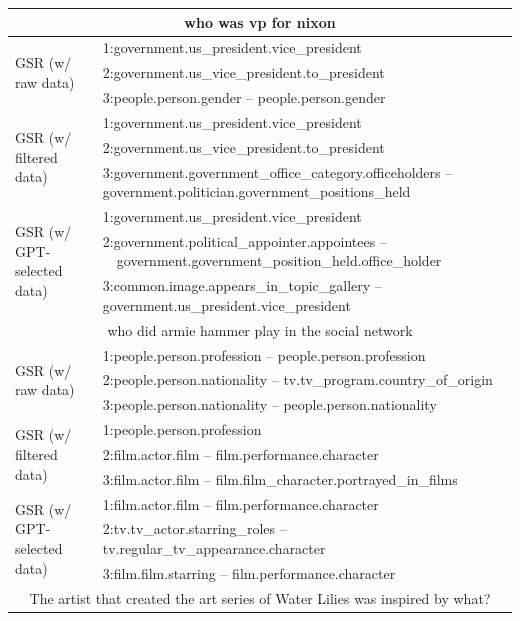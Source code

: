 \begin{table}[h]
    \small
    \centering
    \begin{tabular}{lp{11cm}}
    \toprule
\multicolumn{2}{c}{who was vp for nixon} \\ \midrule
\multirow{3}{*}{GSR (w/ raw data)} & 1:government.us\_president.vice\_president \\
& 2:government.us\_vice\_president.to\_president \\
& 3:people.person.gender -- people.person.gender \\
\midrule
\multirow{3}{*}{GSR (w/ filtered data)} & 1:government.us\_president.vice\_president \\
& 2:government.us\_vice\_president.to\_president \\
& 3:government.government\_office\_category.officeholders -- government.politician.government\_positions\_held \\
\midrule
\multirow{3}{*}{GSR (w/ GPT-selected data)} & 1:government.us\_president.vice\_president \\
& 2:government.political\_appointer.appointees -- \ \ government.government\_position\_held.office\_holder \\
& 3:common.image.appears\_in\_topic\_gallery -- government.us\_president.vice\_president \\
\midrule
\multicolumn{2}{c}{who did armie hammer play in the social network} \\ \midrule
\multirow{3}{*}{GSR (w/ raw data)} & 1:people.person.profession -- people.person.profession \\
& 2:people.person.nationality -- tv.tv\_program.country\_of\_origin \\
& 3:people.person.nationality -- people.person.nationality \\
\midrule
\multirow{3}{*}{GSR (w/ filtered data)} & 1:people.person.profession \\
& 2:film.actor.film -- film.performance.character \\
& 3:film.actor.film -- film.film\_character.portrayed\_in\_films \\
\midrule
\multirow{3}{*}{GSR (w/ GPT-selected data)} & 1:film.actor.film -- film.performance.character \\
& 2:tv.tv\_actor.starring\_roles -- tv.regular\_tv\_appearance.character \\
& 3:film.film.starring -- film.performance.character \\
\midrule
\multicolumn{2}{c}{The artist that created the art series of Water Lilies was inspired by what?} \\ \midrule

\end{tabular}
\end{table}

